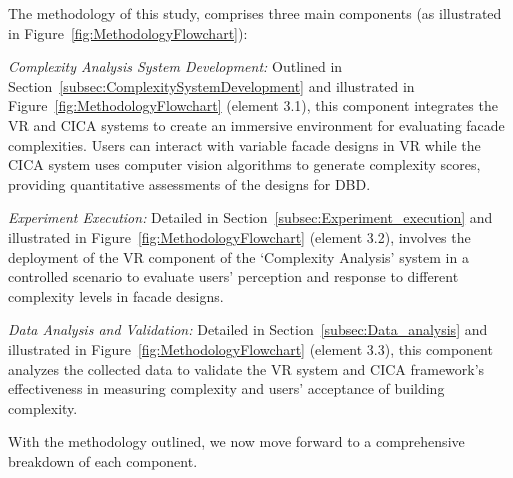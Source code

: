 The methodology of this study, comprises three main components (as illustrated in  Figure~\ref{fig:MethodologyFlowchart}):

\textit{Complexity Analysis System Development:}  Outlined in Section~\ref{subsec:ComplexitySystemDevelopment} and illustrated in Figure~\ref{fig:MethodologyFlowchart} (element 3.1), this component integrates the VR and CICA systems to create an immersive environment for evaluating facade complexities.
Users can interact with variable facade designs in VR while the CICA system uses computer vision algorithms to generate complexity scores, providing quantitative assessments of the designs for DBD\@.

\textit{Experiment Execution:} Detailed in Section~\ref{subsec:Experiment_execution} and illustrated in Figure~\ref{fig:MethodologyFlowchart} (element 3.2), involves the deployment of the VR component of the `Complexity Analysis' system in a controlled scenario to evaluate users' perception and response to different complexity levels in facade designs.

\textit{Data Analysis and Validation:} Detailed in Section~\ref{subsec:Data_analysis} and illustrated in Figure~\ref{fig:MethodologyFlowchart} (element 3.3), this component analyzes the collected data to validate the VR system and CICA framework's effectiveness in measuring complexity and
users' acceptance of building complexity.

With the methodology outlined, we now move forward to a comprehensive breakdown of each component.


